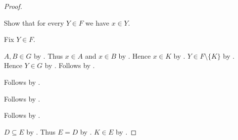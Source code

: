 \begin{proof}
\begin{subproof}
\begin{subproof}
\begin{subproof}
                Show that for every $Y\in F$ we have $x\in Y$.
                \begin{subproof}
                    Fix $Y\in F$.
                    \begin{byCase}
                        $A,B\in G$ by .
                        Thus $x\in A$ and $x\in B$ by .
                        Hence $x\in K$ by .
                        $Y\in F\setminus\{K\}$ by
                            .
                        Hence $Y\in G$ by .
                        Follows by .
                    \end{byCase}
                \end{subproof}
                Follows by .
            \end{subproof}
            Follows by .
        \end{subproof}
        Follows by .
    \end{subproof}

    $D\subseteq E$ by .
    Thus $E=D$ by .
    $K\in E$ by .
\end{proof}

